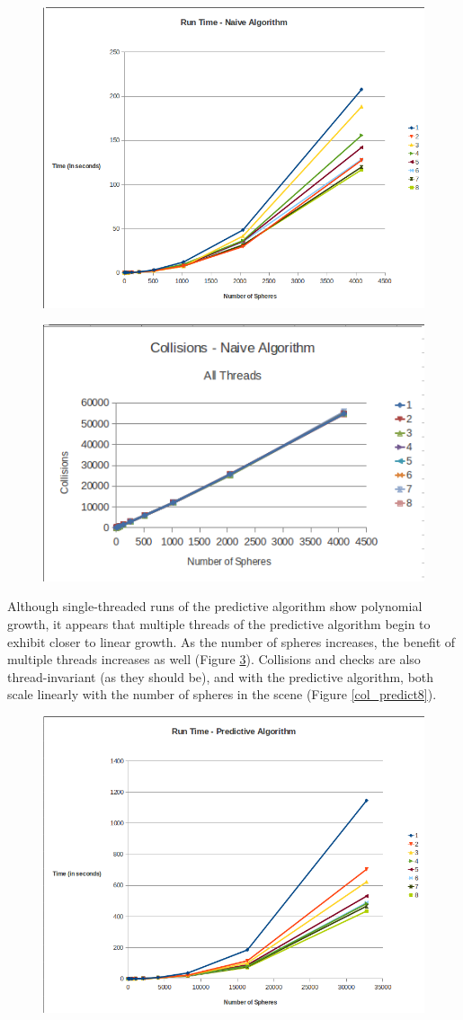 \documentclass[CEJCS,PDF]{cej} %
\begin{document}
\begin{center}
\begin{figure}
	\includegraphics[width=.45\textwidth]{runtime_naive_allthreads.png}
	\label{rt_naive8}
\end{figure}
\end{center}

\begin{center}
\begin{figure}
	\includegraphics[width=.45\textwidth]{collisions_naive_allthreads.png}
	\label{col_naive8}
\end{figure}
\end{center}

Although single-threaded runs of the predictive algorithm show polynomial growth, it appears that multiple threads of the predictive algorithm begin to exhibit closer to linear growth.  As the number of spheres increases, the benefit of multiple threads increases as well (Figure \ref{rt_predict8}).  Collisions and checks are also thread-invariant (as they should be), and with the predictive algorithm, both scale linearly with the number of spheres in the scene (Figure \ref{col_predict8}).

\begin{center}
\begin{figure}
	\includegraphics[width=.45\textwidth]{runtime_predictive_allthreads.png}
	\label{rt_predict8}
\end{figure}
\end{center}
\end{document}
